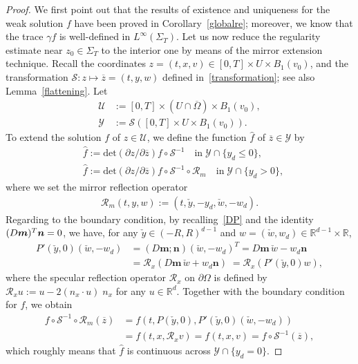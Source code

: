 \documentclass[AHL,Unicode,longabstracts,published]{cedram}
\newcommand*\p{\partial}
\renewcommand*\det{\mathrm{det}}
\newcommand*\Rm {\mathcal{R}_m}
\newcommand*\R {\mathbb{R}}
\renewcommand*\SS {\mathcal{S}}
\newcommand*\RR {\mathcal{R}}
\newcommand*\U {\mathcal{U}}
\newcommand*\Y {\mathcal{Y}}
\newcommand*\mm {\boldsymbol{m}}
\newcommand*\nn {\boldsymbol{n}}
\begin{document}
\begin{proof}
We first point out that the results of existence and uniqueness for the weak solution $f$ have been proved in Corollary~\ref{globalre}; moreover, we know that the trace $\gamma f$ is well-defined in $L^\infty(\Sigma_T)$. Let us now reduce the regularity estimate near $z_0\in\Sigma_T$ to the interior one by means of the mirror extension technique. Recall the coordinates $z=(t,x,v)\in[0,T]\times U\times B_1(v_0)$, and the transformation $\SS:z\mapsto\overline{z}=(t,y,w)$ defined in~\eqref{transformation}; see also Lemma~\ref{flattening}. Let
\begin{align*}
\U&:=[0,T]\times (U\cap\overline{\Omega})\times B_1(v_0),\\
\Y&:=\SS\left([0,T]\times U\times B_1(v_0)\right).
\end{align*}
To extend the solution $f$ of $z\in\U$, we define the function $\widehat{f}$ of $\overline{z}\in\Y$ by
\begin{align*}
&\widehat{f}:=\det\!\left({\p z}/{\p\overline{z}}\right) f\circ\SS^{-1} \quad\text{in}\;\Y\cap\{y_d\le0\},\\
&\widehat{f}:=\det\!\left({\p z}/{\p\overline{z}}\right) f\circ\SS^{-1}\!\circ\Rm \quad\text{in}\;\Y\cap\{y_d>0\},
\end{align*}
where we set the mirror reflection operator
\begin{align*}
\Rm(t,y,w):=\left(t,\check{y},-y_d,\check{w},-w_d\right).
\end{align*}
Regarding to the boundary condition, by recalling~\eqref{DP} and the identity $(D\mm)^T\nn\linebreak=0$, we have, for any $\check{y}\in(-R,R)^{d-1}$ and $w=(\check{w},w_d)\in \R^{d-1}\times\R$,
\begin{align*}
P'(\check{y},0)(\check{w},-w_d)&= (D\mm;\nn)(\check{w},-w_d)^T = D\mm\,\check{w}-w_d\nn\\
&=\RR_x(D\mm\,\check{w}+w_d\nn)\; = \RR_x(P'(\check{y},0)w),
\end{align*}
where the specular reflection operator $\RR_x$ on $\p\Omega$ is defined by $\RR_xu:=u-2(n_x\cdot u)\;\!n_x$ for any $u\in\R^d$. Together with the boundary condition for $f$, we obtain
\begin{equation}\label{reflection}
\begin{split}
f\circ\SS^{-1}\!\circ\Rm(\overline{z}) &=f\left(t,P(\check{y},0),P'(\check{y},0)(\check{w},-w_d)\right)\\
&=f(t,x,\RR_x v)=f\left(t,x,v\right)=f\circ\SS^{-1}(\overline{z}),
\end{split}
\end{equation}
which roughly means that $\widehat{f}$ is continuous across $\Y\cap\{y_d=0\}$.


\end{proof}
\end{document}
